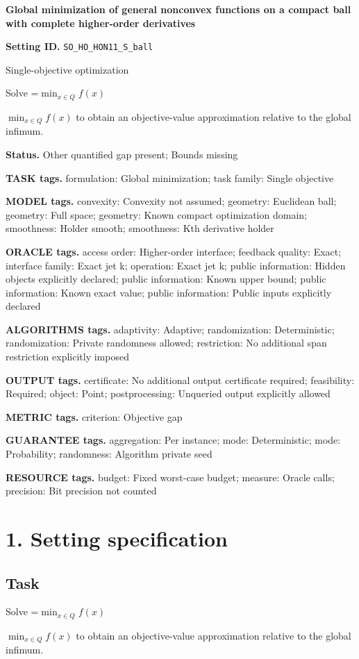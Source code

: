 \documentclass[10pt,a4paper]{article}
\newcommand{\AtlasMath}[1]{\par\begingroup\centering\setbox0=\hbox{$\displaystyle #1$}\ifdim\wd0>1.4\linewidth\typeout{ATLAS WIDE FORMULA: \the\wd0}\fi\ifdim\wd0>\linewidth\resizebox{\linewidth}{!}{\box0}\else\box0\fi\par\endgroup}
\newcommand{\AtlasInlineMath}[1]{\begingroup\setbox0=\hbox{$#1$}\ifdim\wd0>.4\linewidth\endgroup\AtlasMath{#1}\else\endgroup$#1$\fi}
\begin{document}
\raggedright

{\LARGE\bfseries\sffamily\color{AtlasNavy} Global minimization of general nonconvex functions on a compact ball with complete higher-order derivatives\par}\vspace{5pt}
\textbf{Setting ID.} \texttt{SO\_\allowbreak{}HO\_\allowbreak{}HON11\_\allowbreak{}S\_\allowbreak{}ball}

Single-objective optimization

Solve \AtlasInlineMath{\min_{x\in Q}f(x)} to obtain an objective-value approximation relative to the global infimum.

\textbf{Status.} Other quantified gap present; Bounds missing

\textbf{TASK tags.} formulation: Global minimization; task family: Single objective

\textbf{MODEL tags.} convexity: Convexity not assumed; geometry: Euclidean ball; geometry: Full space; geometry: Known compact optimization domain; smoothness: Holder smooth; smoothness: Kth derivative holder

\textbf{ORACLE tags.} access order: Higher-order interface; feedback quality: Exact; interface family: Exact jet k; operation: Exact jet k; public information: Hidden objects explicitly declared; public information: Known upper bound; public information: Known exact value; public information: Public inputs explicitly declared

\textbf{ALGORITHMS tags.} adaptivity: Adaptive; randomization: Deterministic; randomization: Private randomness allowed; restriction: No additional span restriction explicitly imposed

\textbf{OUTPUT tags.} certificate: No additional output certificate required; feasibility: Required; object: Point; postprocessing: Unqueried output explicitly allowed

\textbf{METRIC tags.} criterion: Objective gap

\textbf{GUARANTEE tags.} aggregation: Per instance; mode: Deterministic; mode: Probability; randomness: Algorithm private seed

\textbf{RESOURCE tags.} budget: Fixed worst-case budget; measure: Oracle calls; precision: Bit precision not counted

\section{1. Setting specification}
\subsection{Task}
Solve \AtlasInlineMath{\min_{x\in Q}f(x)} to obtain an objective-value approximation relative to the global infimum.
\end{document}
